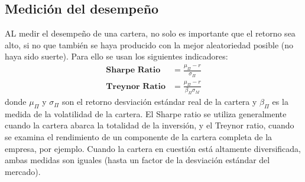\subsection{Medición del desempeño}
AL medir el desempeño de una cartera, no solo es importante que el retorno sea alto, si no que también se haya producido con la mejor aleatoriedad posible (no haya sido suerte). Para ello se usan los siguientes indicadores:
\begin{align*}
    \textbf{Sharpe Ratio} &= \boxed{\frac{\mu_{\Pi} - r}{\sigma_{\Pi}}} \\
    \textbf{Treynor Ratio} &= \boxed{\frac{\mu_{\Pi} - r}{\beta_{\Pi} \sigma_M}}
\end{align*}
donde $\mu_{\Pi}$ y $\sigma_{\Pi}$ son el retorno desviación estándar real de la cartera y $\beta_{\Pi}$ es la medida de la volatilidad de la cartera. El Sharpe ratio se utiliza generalmente cuando la cartera abarca la totalidad de la inversión, y el Treynor ratio, cuando se examina el rendimiento de un componente de la cartera completa de la empresa, por ejemplo. Cuando la cartera en cuestión está altamente diversificada, ambas medidas son iguales (hasta un factor de la desviación estándar del mercado).








